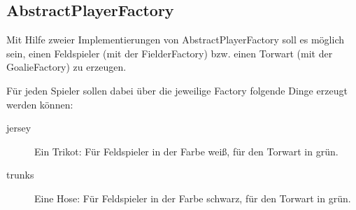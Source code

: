 \documentclass[oneside,a4paper]{scrartcl}
\begin{document}
\subsection{AbstractPlayerFactory}

Mit Hilfe zweier Implementierungen von AbstractPlayerFactory soll es möglich sein, einen Feldspieler (mit der FielderFactory) bzw.
einen Torwart (mit der GoalieFactory) zu erzeugen.

Für jeden Spieler sollen dabei über die jeweilige Factory folgende Dinge erzeugt werden können:

\begin{description}
  \item[jersey] Ein Trikot: Für Feldspieler in der Farbe weiß, für den Torwart in grün.
  \item[trunks] Eine Hose: Für Feldspieler in der Farbe schwarz, für den Torwart in grün.
\end{description}
\end{document}
